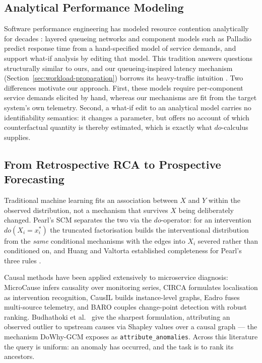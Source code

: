 \documentclass[journal, 10pt]{IEEEtran}
\begin{document}
\subsection{Analytical Performance Modeling}
Software performance engineering has modeled resource contention analytically
for decades \cite{balsamo2004survey,woodside2007future}: layered queueing
networks \cite{franks2009lqn} and component models such as Palladio
\cite{becker2009palladio} predict response time from a hand-specified model of
service demands, and support what-if analysis by editing that model. This
tradition answers questions structurally similar to ours, and our
queueing-inspired latency mechanism (Section~\ref{sec:workload-propagation})
borrows its heavy-traffic intuition \cite{kingman1961}. Two differences
motivate our approach. First, these models require per-component service demands
elicited by hand, whereas our mechanisms are fit from the target system's own
telemetry. Second, a what-if edit to an analytical model carries no
identifiability semantics: it changes a parameter, but offers no account of
which counterfactual quantity is thereby estimated, which is exactly what
$do$-calculus supplies.

\subsection{From Retrospective RCA to Prospective Forecasting}
Traditional machine learning fits an association between $X$ and $Y$ within the
observed distribution, not a mechanism that survives $X$ being deliberately
changed. Pearl's SCM \cite{pearl2009causality} separates the two via the
$do$-operator: for an intervention $do(X_i = x_i^*)$ the truncated factorisation
builds the interventional distribution from the \emph{same} conditional
mechanisms with the edges into $X_i$ severed rather than conditioned on, and
Huang and Valtorta established completeness for Pearl's three rules
\cite{huang2006complete}.

Causal methods have been applied extensively to microservice diagnosis:
MicroCause \cite{meng2020microcause} infers causality over monitoring series,
CIRCA \cite{li2022circa} formulates localisation as intervention recognition,
CausIL \cite{chakraborty2023causil} builds instance-level graphs, Eadro
\cite{lee2023eadro} fuses multi-source telemetry, and BARO
\cite{nguyen2024baro} couples change-point detection with robust ranking.
Budhathoki et al.\ \cite{budhathoki2022rootcause} give the sharpest formulation,
attributing an observed outlier to upstream causes via Shapley values over a
causal graph --- the mechanism DoWhy-GCM \cite{blobaum2024dowhy,sharma2020dowhy}
exposes as \texttt{attribute\_anomalies}. Across this literature the query is
uniform: an anomaly has occurred, and the task is to rank its ancestors.
\end{document}
